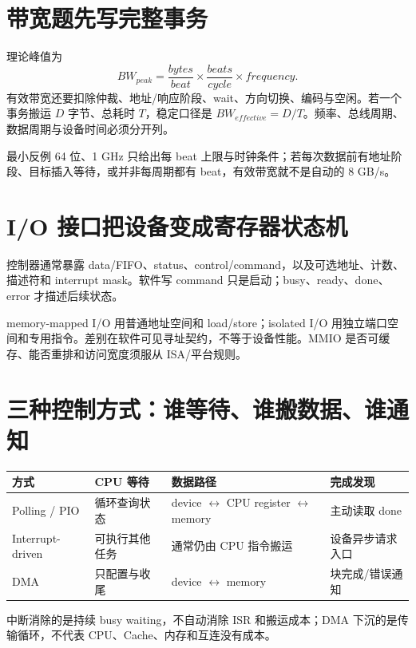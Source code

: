 \documentclass[UTF8,fontset=fandol,11pt,a4paper]{ctexart}
\begin{document}
\section{带宽题先写完整事务}
理论峰值为
\[
BW_{peak}=\frac{bytes}{beat}\times\frac{beats}{cycle}\times frequency.
\]
有效带宽还要扣除仲裁、地址/响应阶段、wait、方向切换、编码与空闲。若一个事务搬运 $D$ 字节、总耗时 $T$，稳定口径是 $BW_{effective}=D/T$。频率、总线周期、数据周期与设备时间必须分开列。

\begin{warnbox}{最小反例}
64 位、1 GHz 只给出每 beat 上限与时钟条件；若每次数据前有地址阶段、目标插入等待，或并非每周期都有 beat，有效带宽就不是自动的 8 GB/s。
\end{warnbox}

\section{I/O 接口把设备变成寄存器状态机}
控制器通常暴露 data/FIFO、status、control/command，以及可选地址、计数、描述符和 interrupt mask。软件写 command 只是启动；busy、ready、done、error 才描述后续状态。

memory-mapped I/O 用普通地址空间和 load/store；isolated I/O 用独立端口空间和专用指令。差别在软件可见寻址契约，不等于设备性能。MMIO 是否可缓存、能否重排和访问宽度须服从 ISA/平台规则。

\section{三种控制方式：谁等待、谁搬数据、谁通知}
\begin{center}\small
\begin{tabularx}{\linewidth}{L{2.0cm}YYY}\toprule
方式 & CPU 等待 & 数据路径 & 完成发现\\\midrule
Polling / PIO & 循环查询状态 & device $\leftrightarrow$ CPU register $\leftrightarrow$ memory & 主动读取 done\\
Interrupt-driven & 可执行其他任务 & 通常仍由 CPU 指令搬运 & 设备异步请求入口\\
DMA & 只配置与收尾 & device $\leftrightarrow$ memory & 块完成/错误通知\\
\bottomrule
\end{tabularx}
\end{center}
中断消除的是持续 busy waiting，不自动消除 ISR 和搬运成本；DMA 下沉的是传输循环，不代表 CPU、Cache、内存和互连没有成本。

\begin{center}

\end{center}
\end{document}
